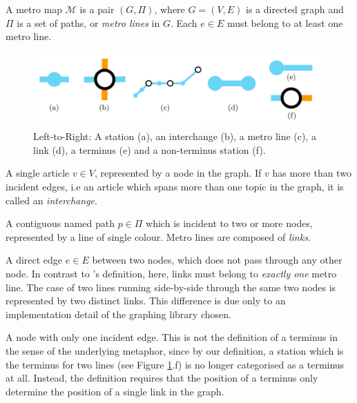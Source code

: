 \addtocounter{definition}{-1}
\begin{definition}{}
A metro map $\mathcal{M}$ is a pair $(G, \Pi)$, where $G=(V, E)$ is a directed graph and $\Pi$ is a set of paths, or \textit{metro lines} in $G$. Each $e \in E$ must belong to at least one metro line.
\end{definition}
\vspace{-0.5cm}
\begin{figure}[htbp!]
	\centering
	\includegraphics[width=\textwidth]{img/implementation/mapdefinitions.pdf}
	\vspace{-0.5cm}\caption{Left-to-Right: A station (a), an interchange (b), a metro line (c), a link (d), a terminus (e) and a non-terminus station (f).}
	\label{fig:mapdefinitions}
\end{figure}
\begin{description}[leftmargin=7em,style=nextline]
	\item [Station] A single article $v \in V$, represented by a node in the graph. If $v$ has more than two incident edges, i.e an article which spans more than one topic in the graph, it is called an \textit{interchange}.
	\item [Metro Line] A contiguous named path $p \in \Pi$ which is incident to two or more nodes, represented by a line of single colour. Metro lines are composed of \textit{links}.
	\item [Link] A direct edge $e \in E$ between two nodes, which does not pass through any other node. In contrast to \citeauthor{GeneratingInformationMaps}'s definition, here, links must belong to \textit{exactly one} metro line. The case of two lines running side-by-side through the same two nodes is represented by two distinct links. This difference is due only to an implementation detail of the graphing library chosen.
	\item [Terminus] A node with only one incident edge. This is not the definition of a terminus in the sense of the underlying metaphor, since by our definition, a station which is the terminus for two lines (see Figure \ref{fig:mapdefinitions}.f) is no longer categorised as a terminus at all. Instead, the definition requires that the position of a terminus only determine the position of a single link in the graph.
\end{description}

